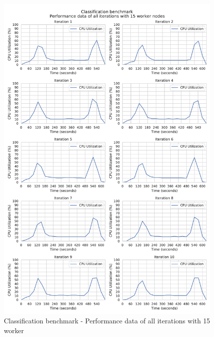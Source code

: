 \begin{figure}[h]
\centering
\includegraphics[scale=0.5]{images/appendix/evaluation_data/classification_benchmark/classification_15_worker_cpu_performance}
\caption{Classification benchmark - Performance data of all iterations with 15 worker}
\label{fig:appendix_eval_classification_static15}
\end{figure}

